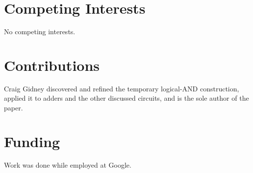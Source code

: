 \documentclass[twocolumn]{revtex4-1}
\begin{document}
\section*{Competing Interests}

No competing interests.


\section*{Contributions}

Craig Gidney discovered and refined the temporary logical-AND construction, applied it to adders and the other discussed circuits, and is the sole author of the paper.


\section*{Funding}

Work was done while employed at Google.




\end{document}
